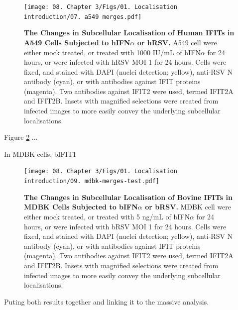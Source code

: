 \begin{figure}
    \centering
    \texttt{[image: 08. Chapter 3/Figs/01. Localisation introduction/07. a549 merges.pdf]}
    \caption[The Changes in Subcellular Localisation of Human IFITs in A549 Cells Subjected to hIFN\(\alpha\) or hRSV.]{\textbf{The Changes in Subcellular Localisation of Human IFITs in A549 Cells Subjected to hIFN\(\alpha\) or hRSV.} A549 cell were either mock treated, or treated with 1000 IU/mL of hIFN\(\alpha\) for 24 hours, or were infected with hRSV MOI 1 for 24 hours. Cells were fixed, and stained with DAPI (nuclei detection; yellow), anti-RSV N antibody (cyan), or with antibodies against IFIT proteins (magenta). Two antibodies against IFIT2 were used, termed IFIT2A and IFIT2B. Insets with magnified selections were created from infected images to more easily convey the underlying subcellular localisations.}
    \label{fig:The Changes in Subcellular Localisation of Human IFITs in A549 Cells Subjected to hIFNa or hRSV}
\end{figure}


Figure \ref{fig:The Changes in Subcellular Localisation of Bovine IFITs in MDBK Cells Subjected to bIFNa or bRSV} ...

In MDBK cells, bIFIT1

\begin{figure}
    \centering
    \texttt{[image: 08. Chapter 3/Figs/01. Localisation introduction/09. mdbk-merges-test.pdf]}
    \caption[The Changes in Subcellular Localisation of Bovine IFITs in MDBK Cells Subjected to bIFN\(\alpha\) or bRSV.]{\textbf{The Changes in Subcellular Localisation of Bovine IFITs in MDBK Cells Subjected to bIFN\(\alpha\) or bRSV.} MDBK cell were either mock treated, or treated with 5 ng/mL of bIFN\(\alpha\) for 24 hours, or were infected with bRSV MOI 1 for 24 hours. Cells were fixed, and stained with DAPI (nuclei detection; yellow), anti-RSV N antibody (cyan), or with antibodies against IFIT proteins (magenta). Two antibodies against IFIT2 were used, termed IFIT2A and IFIT2B. Insets with magnified selections were created from infected images to more easily convey the underlying subcellular localisations.}
    \label{fig:The Changes in Subcellular Localisation of Bovine IFITs in MDBK Cells Subjected to bIFNa or bRSV}
\end{figure}

Puting both results together and linking it to the massive analysis.

